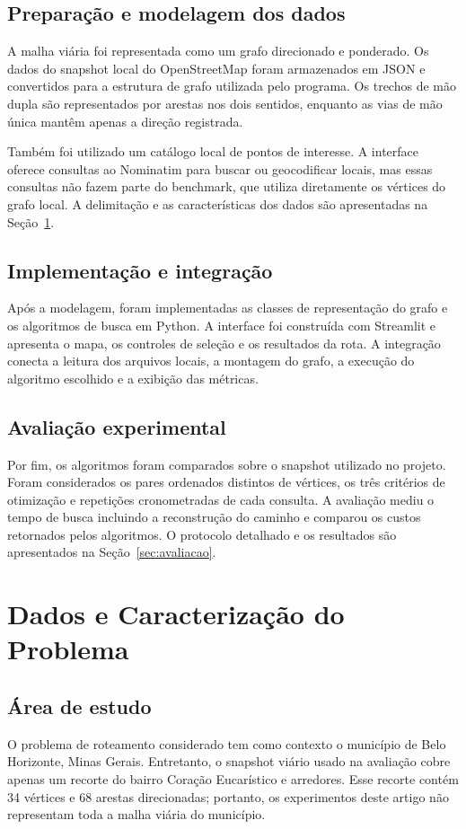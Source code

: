 \documentclass[12pt]{article}
\begin{document}
\subsection{Preparação e modelagem dos dados}

A malha viária foi representada como um grafo direcionado e ponderado.
Os dados do snapshot local do OpenStreetMap foram armazenados em JSON e
convertidos para a estrutura de grafo utilizada pelo programa. Os
trechos de mão dupla são representados por arestas nos dois sentidos,
enquanto as vias de mão única mantêm apenas a direção registrada.

Também foi utilizado um catálogo local de pontos de interesse. A
interface oferece consultas ao Nominatim para buscar ou geocodificar
locais, mas essas consultas não fazem parte do benchmark, que utiliza
diretamente os vértices do grafo local. A delimitação e as
características dos dados são apresentadas na Seção~\ref{sec:dados}.

\subsection{Implementação e integração}

Após a modelagem, foram implementadas as classes de representação do
grafo e os algoritmos de busca em Python. A interface foi construída
com Streamlit e apresenta o mapa, os controles de seleção e os
resultados da rota. A integração conecta a leitura dos arquivos locais,
a montagem do grafo, a execução do algoritmo escolhido e a exibição das
métricas.

\subsection{Avaliação experimental}

Por fim, os algoritmos foram comparados sobre o snapshot utilizado no
projeto. Foram considerados os pares ordenados distintos de vértices,
os três critérios de otimização e repetições cronometradas de cada
consulta. A avaliação mediu o tempo de busca incluindo a reconstrução
do caminho e comparou os custos retornados pelos algoritmos. O
protocolo detalhado e os resultados são apresentados na
Seção~\ref{sec:avaliacao}.
\section{Dados e Caracterização do Problema}
\label{sec:dados}

\subsection{Área de estudo}
O problema de roteamento considerado tem como contexto o município de
Belo Horizonte, Minas Gerais. Entretanto, o snapshot viário usado na
avaliação cobre apenas um recorte do bairro Coração Eucarístico e
arredores. Esse recorte contém 34 vértices e 68 arestas direcionadas; portanto, os
experimentos deste artigo não representam toda a malha viária do
município.
\end{document}
